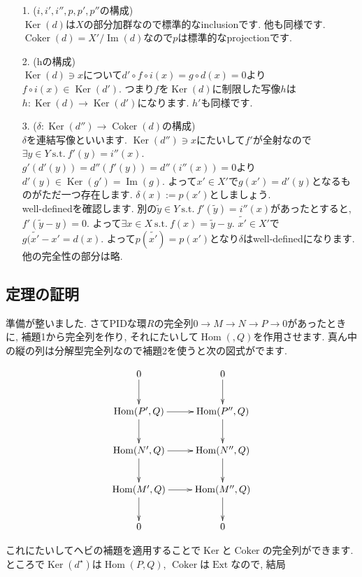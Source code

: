 \documentclass{jsarticle}
\newcommand{\makeop}[1]{\mathop{\mathrm{#1}}\nolimits}
\def\Im{\makeop{Im}}
\def\Ker{\makeop{Ker}}
\def\Hom{\makeop{Hom}}
\def\Ext{\makeop{Ext}}
\def\Coker{\makeop{Coker}}
\def\suchthat{\mathrm{\ s.t.\ }}
\theoremstyle{definition}
\numberwithin{theorem}{section}
\begin{document}
\begin{itemize}
\item[1.] ($i, i', i'', p, p', p''$の構成)\\
$\Ker(d)$は$X$の部分加群なので標準的なinclusionです. 他も同様です. $\Coker(d) = X'/\Im(d)$なので$p$は標準的なprojectionです.

\item[2.] (hの構成)\\
$\Ker(d)\ni x$について$d'\circ f\circ i(x) = g\circ d(x) = 0$より$f\circ i(x) \in \Ker(d')$. つまり$f$を$\Ker(d)$に制限した写像$h$は$h : \Ker(d) \rightarrow \Ker(d')$になります. $h'$も同様です.

\item[3.] ($\delta: \Ker(d'') \rightarrow \Coker(d)$の構成)\\
$\delta$を連結写像といいます. $\Ker(d'') \ni x$にたいして$f'$が全射なので$\exists y \in Y \suchthat f'(y) = i''(x)$. $g'(d'(y)) = d''(f'(y)) = d''(i''(x)) = 0$より$d'(y) \in \Ker(g') = \Im(g)$. よって$x' \in X'$で$g(x') = d'(y)$となるものがただ一つ存在します. $\delta(x) := p(x')$としましょう. \\
well-definedを確認します. 別の$\tilde{y} \in Y \suchthat f'(\tilde{y}) = i''(x)$があったとすると, $f'(\tilde{y} - y) = 0$. よって$\exists x \in X \suchthat f(x) = \tilde{y} - y$. $\tilde{x'} \in X'$で$g(\tilde{x'} - x' = d(x)$. よって$p(\tilde{x'}) = p(x')$となり$\delta$はwell-definedになります. 他の完全性の部分は略.
\end{itemize}

\subsection{定理の証明}
準備が整いました. さてPIDな環$R$の完全列$0 \rightarrow M \rightarrow N \rightarrow P \rightarrow 0$があったときに, 補題1から完全列を作り, それにたいして$\Hom(, Q)$を作用させます. 真ん中の縦の列は分解型完全列なので補題2を使うと次の図式がでます.

\begin{equation*}
\xymatrix{
0 \ar[d] & 0 \ar[d]\\
\Hom(P', Q) \ar[r] \ar[d] & \Hom(P'', Q) \ar[d]\\
\Hom(N', Q) \ar[r] \ar[d] & \Hom(N'', Q) \ar[d]\\
\Hom(M', Q) \ar[r] \ar[d] & \Hom(M'', Q) \ar[d]\\
0 & 0\\
}
\end{equation*}

これにたいしてヘビの補題を適用することで$\Ker$と$\Coker$の完全列ができます. ところで$\Ker(d^\star)$は$\Hom(P, Q)$, $\Coker$は$\Ext$なので, 結局
\end{document}
